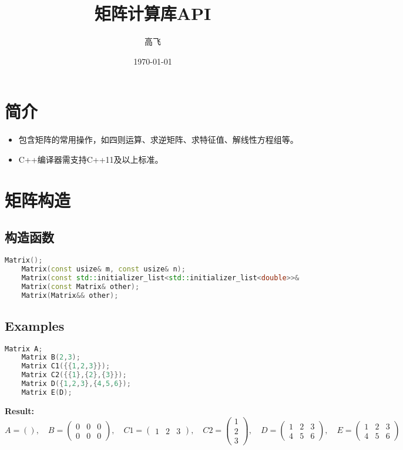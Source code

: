 \documentclass[UTF8]{ctexart}
\title{矩阵计算库API}
\author{高飞}
\date{\today}
\begin{document}
\maketitle
\newpage

\tableofcontents
\newpage

\section{简介}

\begin{itemize}
    \item 包含矩阵的常用操作，如四则运算、求逆矩阵、求特征值、解线性方程组等。
    \item C++编译器需支持C++11及以上标准。
\end{itemize}

\section{矩阵构造}
\subsection{构造函数}
{
    \setmainfont{Consolas}
    \begin{lstlisting}[language=C++]
    Matrix();
    Matrix(const usize& m, const usize& n);
    Matrix(const std::initializer_list<std::initializer_list<double>>& m);
    Matrix(const Matrix& other);
    Matrix(Matrix&& other);
    \end{lstlisting}
}

\subsection{Examples}
{
    \setmainfont{Consolas}
    \begin{lstlisting}[language=C++]
    Matrix A;
    Matrix B(2,3);
    Matrix C1({{1,2,3}});
    Matrix C2({{1},{2},{3}});
    Matrix D({1,2,3},{4,5,6});
    Matrix E(D);
    \end{lstlisting}
}
\textbf{Result:}
{
\small{
$$
A = (),
\quad 
B = \left(
\begin{matrix}
   0 & 0 & 0 \\
   0 & 0 & 0
  \end{matrix}
\right),
\quad
C1 = \left(
\begin{matrix}
   1 & 2 & 3
  \end{matrix}
\right),
\quad
C2 = \left(
\begin{matrix}
   1 \\
   2 \\
   3
  \end{matrix}
\right),
\quad
D = \left(
\begin{matrix}
   1 & 2 & 3 \\
   4 & 5 & 6
  \end{matrix}
\right),
\quad
E = \left(
\begin{matrix}
   1 & 2 & 3 \\
   4 & 5 & 6
  \end{matrix}
\right)
$$
}
}
\end{document}
